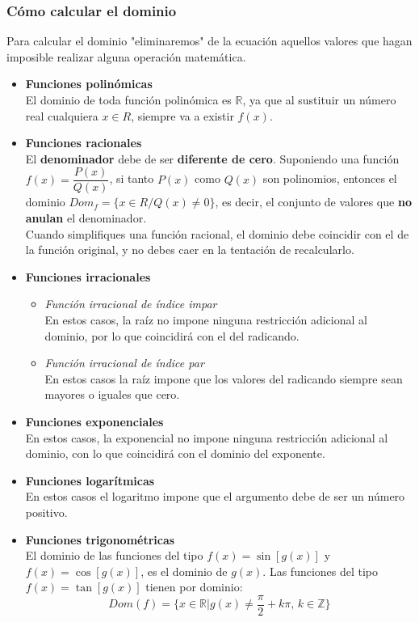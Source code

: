 \subsubsection{Cómo calcular el dominio}
Para calcular el dominio "eliminaremos" de la ecuación aquellos valores que hagan imposible realizar alguna operación matemática.
\begin{itemize}
	\item \textbf{Funciones polinómicas}\\
	El dominio de toda función polinómica es $\mathbb{R}$, ya que al sustituir un número real cualquiera $x \in R$, siempre va a existir $f(x)$.
	\item \textbf{Funciones racionales}\\
	El \textbf{denominador} debe de ser \textbf{diferente de cero}. Suponiendo una función $f(x) = \dfrac{P(x)}{Q(x)}$, si tanto $P(x)$ como $Q(x)$ son polinomios, entonces el dominio $Dom_{f}= \{x \in R / Q(x) \neq 0\}$, es decir, el conjunto de valores que \textbf{no anulan} el denominador.\\
	Cuando simplifiques una función racional, el dominio debe coincidir con el de la función original, y no debes caer en la tentación de recalcularlo.
	\item \textbf{Funciones irracionales}\\
	\begin{itemize}
		\item \emph{Función irracional de índice impar}\\
		En estos casos, la raíz no impone ninguna restricción adicional al dominio, por lo que coincidirá con el del radicando.
		\item \emph{Función irracional de índice par}\\
		En estos casos la raíz impone que los valores del radicando siempre sean mayores o iguales que cero.
	\end{itemize}
	\item \textbf{Funciones exponenciales}\\
	En estos casos, la exponencial no impone ninguna restricción adicional al dominio, con lo que coincidirá con el dominio del exponente.
	\item \textbf{Funciones logarítmicas}\\
	En estos casos el logaritmo impone que el argumento debe de ser un número positivo.
	\item \textbf{Funciones trigonométricas}\\
	El dominio de las funciones del tipo $f(x)=\sin[g(x)]$ y $f(x)=\cos[g(x)]$, es el dominio de $g(x)$. Las funciones del tipo $f(x)=\tan[g(x)]$ tienen por dominio:
	$$Dom(f)=\{x \in \mathbb{R} | g(x) \neq \dfrac{\pi}{2} + k\pi \text{, } k \in \mathbb{Z}\}$$	
\end{itemize}
